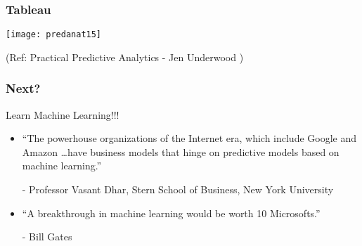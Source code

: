 \begin{frame}\frametitle{Tableau}

\begin{center}
\texttt{[image: predanat15]}
\end{center}

{\tiny (Ref: Practical Predictive Analytics - Jen Underwood )}


\end{frame}

\begin{frame}\frametitle{Next?}
Learn Machine Learning!!!
\begin{itemize}
\item ``The powerhouse organizations of the Internet era, which include Google and
Amazon \ldots have business models that hinge on predictive models based on machine
learning.''

- Professor Vasant Dhar, Stern School of Business, New York University

\item ``A breakthrough in machine learning would be worth 10 Microsofts.'' 

- Bill Gates
\end{itemize}

\end{frame}

